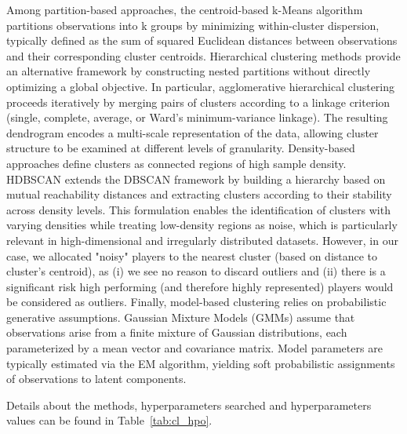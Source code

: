 Among partition-based approaches, the centroid-based k-Means algorithm partitions observations into k  groups by minimizing within-cluster dispersion, typically defined as the sum of squared Euclidean distances between observations and their corresponding cluster centroids. 
Hierarchical clustering methods provide an alternative framework by constructing nested partitions without directly optimizing a global objective. 
In particular, agglomerative hierarchical clustering proceeds iteratively by merging pairs of clusters according to a linkage criterion (single, complete, average, or Ward's minimum-variance linkage). 
The resulting dendrogram encodes a multi-scale representation of the data, allowing cluster structure to be examined at different levels of granularity.
Density-based approaches define clusters as connected regions of high sample density. HDBSCAN extends the DBSCAN framework by building a hierarchy based on mutual reachability distances and extracting clusters according to their stability across density levels. 
This formulation enables the identification of clusters with varying densities while treating low-density regions as noise, which is particularly relevant in high-dimensional and irregularly distributed datasets. 
However, in our case, we allocated "noisy" players to the nearest cluster (based on distance to cluster's centroid), as (i) we see no reason to discard outliers and (ii) there is a significant risk high performing (and therefore highly represented) players would be considered as outliers. 
Finally, model-based clustering relies on probabilistic generative assumptions. 
Gaussian Mixture Models (GMMs) assume that observations arise from a finite mixture of Gaussian distributions, each parameterized by a mean vector and covariance matrix. Model parameters are typically estimated via the EM algorithm, yielding soft probabilistic assignments of observations to latent components. 

Details about the methods, hyperparameters searched and hyperparameters values can be found in Table~\ref{tab:cl_hpo}.

\begin{table}
  \centering
  \small
  \caption{Algorithms and Hyperparameters tested}
  \label{tab:cl_hpo}
  
\end{table}


